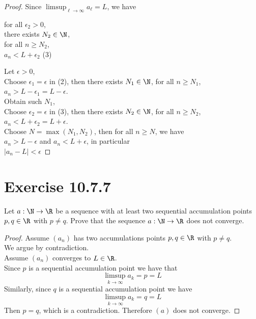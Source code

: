 \documentclass{assignment}
\begin{document}
\begin{proof}[Proof]
        Since $\limsup_{\ell\to\infty}a_\ell = L$, we have \\
        \begin{center}
            \parbox{\linewidth}{
                \linewidth
                for all $\epsilon_2 > 0$, \\
                \hspace*{1em}there exists $N_2 \in \N$, \\
                \hspace*{2em}for all $n \ge N_2$, \\
                \hspace*{3em}$a_n < L + \epsilon_2$
                \hfill (3)
            }
        \end{center}

        \noindent Let $\epsilon > 0$, \\
        Choose $\epsilon_1 = \epsilon$ in (2), then there exists $N_1 \in \N$, for all $n \ge N_1$, $a_n > L - \epsilon_1 = L - \epsilon$. \\
        Obtain such $N_1$, \\
        Choose $\epsilon_2 = \epsilon$ in (3), then there exists $N_2 \in \N$, for all $n \ge N_2$, $a_n < L + \epsilon_2 = L + \epsilon$. \\
        Choose $N = \max(N_1,N_2)$, then for all $n \ge N$, we have \\
        $a_n > L - \epsilon$ and $a_n < L + \epsilon$, in particular \\
        $|a_n - L| < \epsilon$

    \end{proof}

    \section{Exercise 10.7.7}
    \begin{problem}
        Let $a:\N \to \R$ be a sequence with at least two sequential accumulation points $p, q \in \R$ with $p \ne q$.
        Prove that the sequence $a: \N \to \R$ does not converge.
    \end{problem}
    \begin{proof}[Proof]
        Assume $(a_n)$ has two accumulations points $p,q \in \R$ with $p \ne q$. \\

        We argue by contradiction. \\
        Assume $(a_n)$ converges to $L \in \R$. \\
        Since $p$ is a sequential accumulation point we have that 
        $$\limsup_{k\to\infty}a_k = p = L$$
        Similarly, since $q$ is a sequential accumulation point we have
        $$\limsup_{k\to\infty}a_k = q = L$$
        Then $p = q$, which is a contradiction.
        Therefore $(a)$ does not converge.
    \end{proof}
\end{document}
